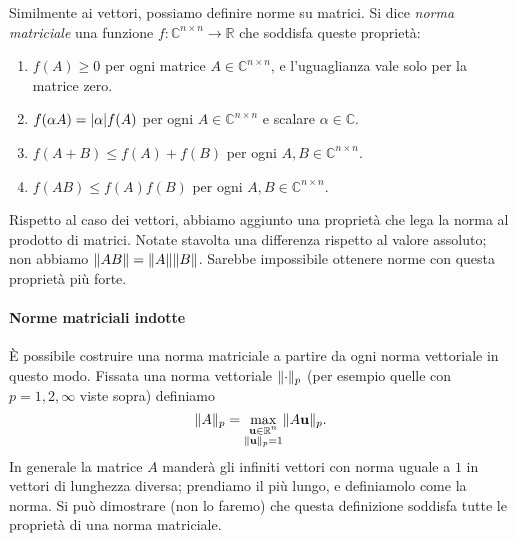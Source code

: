 \documentclass[a4paper]{report}
\DeclarePairedDelimiter{\abs}{\lvert}{\rvert}
\DeclarePairedDelimiter{\norm}{\lVert}{\rVert}
\theoremstyle{definiton}
\theoremstyle{remark}
\begin{document}
Similmente ai vettori, possiamo definire norme su matrici. Si dice \emph{norma matriciale} una funzione $f: \mathbb{C}^{n\times n} \to \mathbb{R}$ che soddisfa queste proprietà:
\begin{enumerate}
    \item $f(A) \geq 0$ per ogni matrice $A\in\mathbb{C}^{n\times n}$, e l'uguaglianza vale solo per la matrice zero.
    \item $f(\alpha A) = \abs{\alpha} f(A)$ per ogni $A\in\mathbb{C}^{n\times n}$ e scalare $\alpha \in \mathbb{C}$.
    \item $f(A+B) \leq f(A) + f(B)$ per ogni $A,B\in\mathbb{C}^{n\times n}$.
    \item $f(AB) \leq f(A)f(B)$ per ogni $A,B\in\mathbb{C}^{n\times n}$.
\end{enumerate}
Rispetto al caso dei vettori, abbiamo aggiunto una proprietà che lega la norma al prodotto di matrici. Notate stavolta una differenza rispetto al valore assoluto; non abbiamo $\norm{AB} = \norm{A}\norm{B}$. Sarebbe impossibile ottenere norme con questa proprietà più forte.

\paragraph{Norme matriciali indotte}

È possibile costruire una norma matriciale a partire da ogni norma vettoriale in questo modo. Fissata una norma vettoriale $\norm{\cdot}_p$ (per esempio quelle con $p = 1,2,\infty$ viste sopra) definiamo
\begin{equation} \label{normamatriciale}
    \norm{A}_p = \max_{\substack{\mathbf{u}\in\mathbb{R}^n \\ \norm{\mathbf{u}}_p=1}} \norm{A\mathbf{u}}_p.
\end{equation}
In generale la matrice $A$ manderà gli infiniti vettori con norma uguale a $1$ in vettori di lunghezza diversa; prendiamo il più lungo, e definiamolo come la norma. Si può dimostrare (non lo faremo) che questa definizione soddisfa tutte le proprietà di una norma matriciale.
\end{document}
